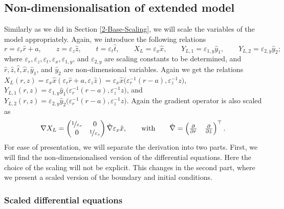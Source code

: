 \documentclass[11pt]{article}
\numberwithin{equation}{section}
\begin{document}
\subsection{Non-dimensionalisation of extended model}
\label{app:non-dim}

Similarly as we did in Section \ref{2-Base-Scaling}, 
we will scale the variables of the model appropriately. Again, we introduce the following relations
\[
    r = \varepsilon_r \hat{r} + a,
    \qquad
    z = \varepsilon_z \hat{z},
    \qquad
    t = \varepsilon_t \hat{t},
    \qquad
    X_L = \varepsilon_x \hat{x},
    \qquad
    Y_{L,1} = \varepsilon_{1,y} \hat{y}_1,
    \qquad
    Y_{L,2} = \varepsilon_{2,y} \hat{y}_2;
\]
where \( \varepsilon_r, \varepsilon_z, \varepsilon_t, \varepsilon_x, \varepsilon_{1,y}\), and \(\varepsilon_{2,y}\) are scaling constants to be determined, and \(\hat{r}, \hat z, \hat t, \hat x, \hat y_1\), and \(\hat y_2\) are non-dimensional variables.
Again we get the relations \(X_L(r,z) = \varepsilon_x \hat{x} (\varepsilon_r \hat r + a, \varepsilon_z \hat z) = \varepsilon_x \hat{x} \big( \varepsilon_r^{-1} (r-a) , \varepsilon_z^{-1} z\big) \), \(Y_{L,1} (r,z) = \varepsilon_{1,y} \hat{y}_1 \big( \varepsilon_r^{-1} (r-a), \varepsilon_z^{-1} z \big)\), and \(Y_{L,2} (r,z) = \varepsilon_{2,y} \hat{y}_2 \big( \varepsilon_r^{-1} (r-a), \varepsilon_z^{-1} z \big)\). Again the gradient operator is also scaled as
\[
    \nabla X_L =
    \begin{pmatrix}
        \nicefrac{1}{\varepsilon_r} & 0 \\
        0 & \nicefrac{1}{\varepsilon_z}
    \end{pmatrix}
    \hat{\nabla} \varepsilon_x \hat{x},
    \qquad \text{with} \qquad
    \hat{\nabla} = 
    \begin{pmatrix}
        \pd{ }{\hat r}
        &
        \pd{ }{\hat z}
    \end{pmatrix}^\top .
\]
For ease of presentation, we will separate the derivation into two parts. First, we will find the non-dimensionalised version of the differential equations. Here the choice of the scaling will not be explicit. This changes in the second part, where we present a scaled version of the boundary and initial conditions.

\subsubsection{Scaled differential equations}
\end{document}
